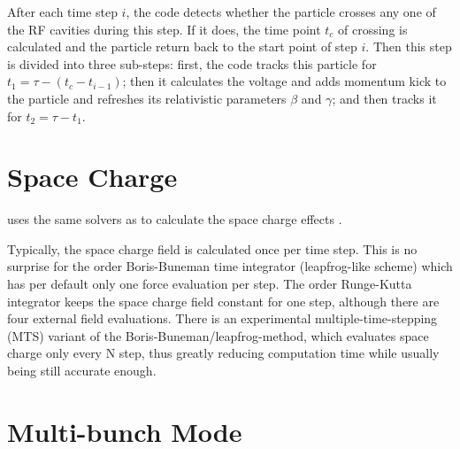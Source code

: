 After each time step $i$, the code detects whether the particle crosses any one of the RF cavities during this step.
If it does, the time point $t_c$ of crossing is calculated and the particle return back to the start point of
step $i$. Then this step is divided into three sub-steps:
first, the code tracks this particle for $ t_1 = \tau - (t_c-t_{i-1})$;
then it calculates the voltage and adds momentum kick to the particle and refreshes its relativistic parameters $\beta$ and $\gamma$;
and then tracks it for $t_2 = \tau - t_1$.

\section{Space Charge}

\opalcycl uses the same solvers as \opalt to calculate the space charge effects .

Typically, the space charge field is calculated once per time step. This is no surprise for the  order Boris-Buneman time integrator (leapfrog-like scheme) which has per default only one force evaluation per step. The  order Runge-Kutta integrator keeps the space charge field constant for one step, although there are four external field evaluations. There is an experimental multiple-time-stepping (MTS) variant of the Boris-Buneman/leapfrog-method, which evaluates space charge only every N step, thus greatly reducing computation time while usually being still accurate enough.


\section{Multi-bunch Mode}
\label{sec:opalcycl:MultiBunch}

